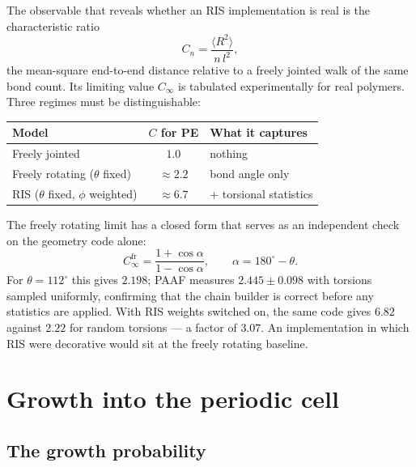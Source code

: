 \documentclass[11pt,a4paper]{article}
\begin{document}
The observable that reveals whether an RIS implementation is real is the
characteristic ratio
\begin{equation}
  C_n = \frac{\langle R^2 \rangle}{n\,l^2},
  \label{eq:cn}
\end{equation}
the mean-square end-to-end distance relative to a freely jointed walk of the
same bond count. Its limiting value $C_\infty$ is tabulated experimentally for
real polymers. Three regimes must be distinguishable:

\begin{center}
\small
\begin{tabular}{lcl}
\toprule
Model & $C$ for PE & What it captures \\
\midrule
Freely jointed & $1.0$ & nothing \\
Freely rotating ($\theta$ fixed) & $\approx 2.2$ & bond angle only \\
RIS ($\theta$ fixed, $\phi$ weighted) & $\approx 6.7$ & + torsional statistics \\
\bottomrule
\end{tabular}
\end{center}

The freely rotating limit has a closed form that serves as an independent
check on the geometry code alone:
\begin{equation}
  C_\infty^{\text{fr}} = \frac{1 + \cos\alpha}{1 - \cos\alpha},
  \qquad \alpha = 180^\circ - \theta .
  \label{eq:freelyrotating}
\end{equation}
For $\theta = 112^\circ$ this gives $2.198$; PAAF measures $2.445 \pm 0.098$
with torsions sampled uniformly, confirming that the chain builder is correct
before any statistics are applied. With RIS weights switched on, the same code
gives $6.82$ against $2.22$ for random torsions --- a factor of $3.07$. An
implementation in which RIS were decorative would sit at the freely rotating
baseline.

\section{Growth into the periodic cell}
\label{sec:growth}

\subsection{The growth probability}
\end{document}
